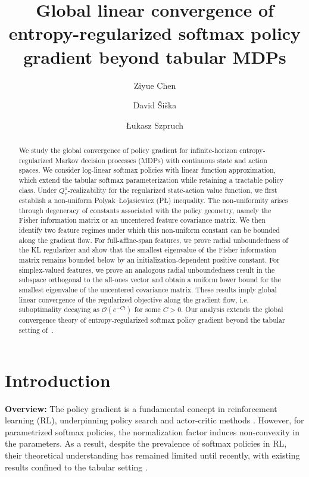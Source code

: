 \documentclass{amsart}
\title[Global linear convergence of softmax policy gradient]{Global linear convergence of entropy-regularized softmax policy gradient beyond tabular MDPs}
\author{Ziyue Chen}
\author{David {\v{S}}i{\v{s}}ka}
\author{{\L}ukasz Szpruch}
\theoremstyle{definition}
\begin{document}
\begin{abstract}
We study the global convergence of policy gradient for infinite-horizon entropy-regularized Markov decision processes (MDPs) with continuous state and action spaces.
We consider log-linear softmax policies with linear function approximation, which extend the tabular softmax parameterization while retaining a tractable  policy class. Under $Q^\pi_\tau$-realizability for the regularized state-action value function, we first establish a non-uniform Polyak--{\L}ojasiewicz (P\L) inequality.
The non-uniformity arises through degeneracy of constants associated with the policy geometry, namely the Fisher information matrix or an uncentered feature covariance matrix. We then identify two feature regimes under which this non-uniform constant can be bounded along the gradient flow.
For full-affine-span features, we prove radial unboundedness of the KL regularizer and show that the smallest eigenvalue of the Fisher information matrix remains bounded below by an initialization-dependent positive constant.
For simplex-valued features, we prove an analogous radial unboundedness result in the subspace orthogonal to the all-ones vector and obtain a uniform lower bound for the smallest eigenvalue of the uncentered covariance matrix.
These results imply global linear convergence of the regularized objective along the gradient flow, i.e. suboptimality decaying as $\mathcal{O}(e^{-Ct})$ for some $C>0$.
Our analysis extends the global convergence theory of entropy-regularized softmax policy gradient beyond the tabular setting of~\cite{agarwal2020optimality, bhandari2024global, mei2020global}.
\end{abstract}

\maketitle


\section{Introduction}
\label{sec:intro}

\textbf{Overview:} The policy gradient is a fundamental concept in reinforcement learning (RL), underpinning policy search and actor-critic methods \cite{sutton1999policy}. However, for parametrized softmax policies, the normalization factor induces non-convexity in the parameters. As a result, despite the prevalence of softmax policies in RL, their theoretical understanding has remained limited until recently, with existing results confined to the tabular setting \cite{agarwal2020optimality,agarwal2021theory,bhandari2024global,mei2020global}.
\end{document}
